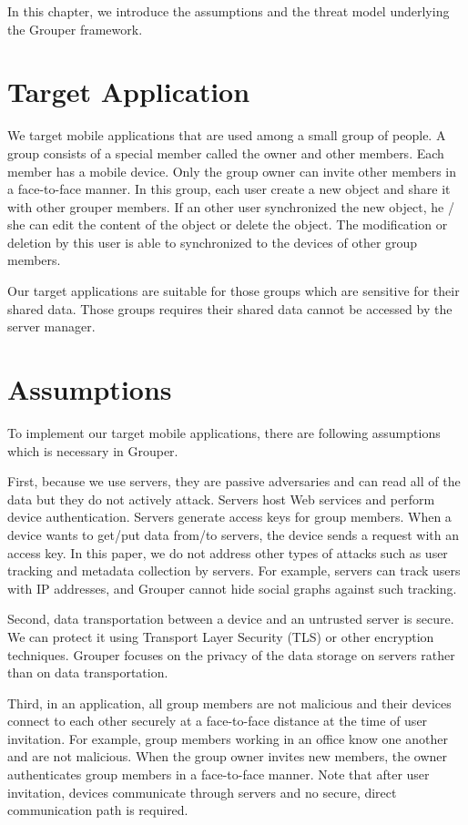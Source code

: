 \documentclass[a4paper,11pt]{report}
\begin{document}
In this chapter, we introduce the assumptions and the threat model underlying the Grouper framework.

\section{Target Application}

We target mobile applications that are used among a small group of people.
A group consists of a special member called the owner and other members.
Each member has a mobile device.
Only the group owner can invite other members in a face-to-face manner.
In this group, each user create a new object and share it with other grouper members.
If an other user synchronized the new object, he / she can edit the content of the object or delete the object.
The modification or deletion by this user is able to synchronized to the devices of other group members.

Our target applications are suitable for those groups which are sensitive for their shared data.
Those groups requires their shared data cannot be accessed by the server manager.

\section{Assumptions}

To implement our target mobile applications, there are following assumptions which is necessary in Grouper.

First, because we use servers, they are passive adversaries and can read all of the data but they do not actively attack.
Servers host Web services and perform device authentication.
Servers generate access keys for group members. 
When a device wants to get/put data from/to servers, the device sends a request with an access key.
In this paper, we do not address other types of attacks such as user tracking and metadata collection by servers. 
For example, servers can track users with IP addresses, and Grouper cannot hide social graphs against such tracking.

Second, data transportation between a device and an untrusted server is secure.
We can protect it using Transport Layer Security (TLS) or other encryption techniques.
Grouper focuses on the privacy of the data storage on servers rather than on data transportation.

Third, in an application, all group members are not malicious and their devices connect to each other securely at a face-to-face distance at the time of user invitation.
For example, group members working in an office know one another and are not malicious.
When the group owner invites new members, the owner authenticates group members in a face-to-face manner.
Note that after user invitation, devices communicate through servers and no secure, direct communication path is required.
\end{document}
